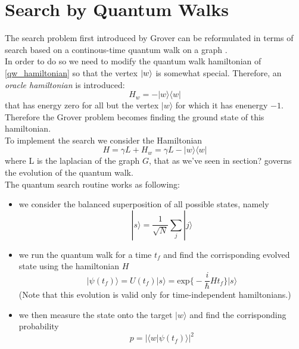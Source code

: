 \section{Search by Quantum Walks}\label{sec:search quantum walk}
The search problem first introduced by Grover can be reformulated in terms of search based on a continous-time quantum walk on a graph \cite{Childs2004}. \\In order to do so we need to modify the quantum walk hamiltonian of \cref{qw_hamiltonian} so that the vertex ${|{w}\rangle}$ is somewhat special. Therefore, an \textit{oracle hamiltonian} is introduced:
\begin{equation}
  H_w = -|w\rangle\langle w|
\end{equation}
that has energy zero for all but the vertex $|w\rangle$ for which it has enenergy $-1$. Therefore the Grover problem becomes finding the ground state of this hamiltonian. \\To implement the search we consider the Hamiltonian
\begin{equation}
  H = \gamma L + H_w = \gamma L -|w\rangle\langle w|
\end{equation}
where L is the laplacian of the graph $G$, that as we've seen in section? governs the evolution of the quantum walk.\\
The quantum search routine works as following:
\begin{itemize}
  \item we consider the balanced superposition of all possible states, namely
  \begin{equation}
    |s\rangle = \frac{1}{\sqrt{N}}\sum_j|j\rangle
  \end{equation}

  \item we run the quantum walk for a time $t_f$ and find the corrisponding evolved state using the hamiltonian $H$
  \begin{equation}
  |\psi(t_f)\rangle = U(t_f)|s\rangle  = \mbox{exp}\Big\{-\frac{i}{\hbar}Ht_f\Big\}|s\rangle
  \end{equation}
  (Note that this evolution is valid only for time-independent hamiltonians.)

  \item we then measure the state onto the target $|w\rangle$ and find the corrisponding probability
  \begin{equation}
    p = |\langle w|\psi(t_f)\rangle|^2
  \end{equation}

\end{itemize}
